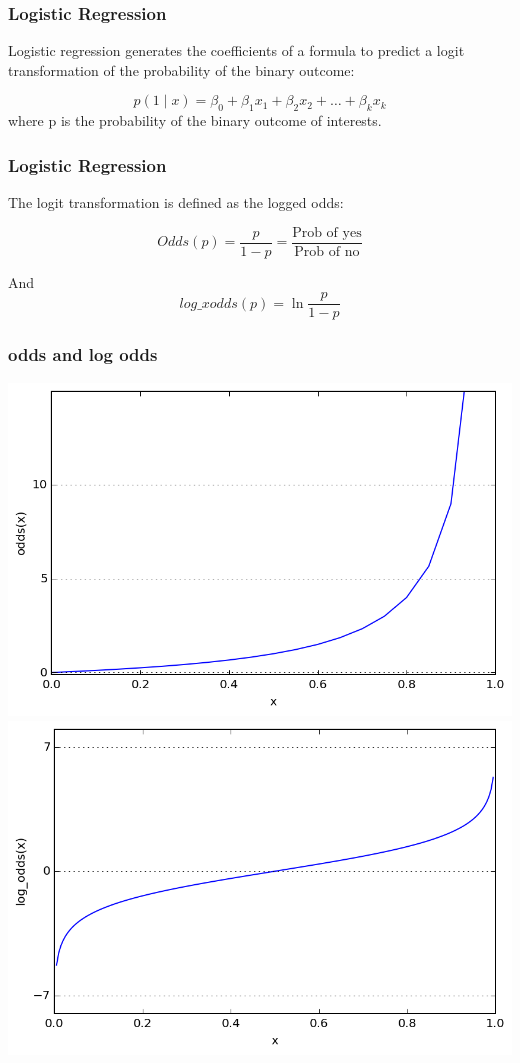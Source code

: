 \documentclass[aspectratio=169]{beamer}
\begin{document}
\begin{frame}
    \frametitle{Logistic Regression}
Logistic regression generates the coefficients of a formula to predict a
logit 
transformation of the probability of the binary outcome:
 
 \begin{equation}
	p(1 \mid x)=\beta_0+\beta_1 x_1+\beta_2 x_2 +\ldots+\beta_k x_k
\end{equation}
where p is the probability of the binary outcome of interests.
\end{frame}

\begin{frame}
    \frametitle{Logistic Regression}
  The logit transformation is defined as the logged odds:
  
\begin{equation}
	Odds(p) = \frac{p}{1-p} = \frac{\text{Prob of yes}}
    {\text{Prob of no}}
\end{equation}

And 
\begin{equation}
log\_xodds(p) = \ln{\frac{p}{1-p}}
\end{equation}


\end{frame}


\begin{frame}
\frametitle{odds and log odds}
  \includegraphics[scale = 0.4]{pic/odds.png}
  \includegraphics[scale = 0.4]{pic/logodds.png}
\end{frame}
\end{document}
